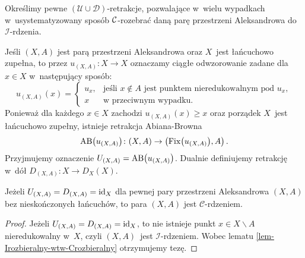 Określimy pewne $(\mathcal{U}\cup \mathcal{D})$-retrakcje, pozwalające w~wielu wypadkach w~usystematyzowany sposób $\mathcal{C}$-rozebrać daną parę przestrzeni Aleksandrowa do $\mathcal{I}$-rdzenia.

Jeśli $(X,A)$ jest parą przestrzeni Aleksandrowa oraz $X$~jest łańcuchowo zupełna, to przez $u_{(X,A)}:X\to X$ oznaczamy ciągłe odwzorowanie zadane dla $x\in X$ w~następujący sposób: \[u_{(X,A)}(x)=\begin{cases}u_x, & \text{jeśli } x\not\in A\text{ jest punktem nieredukowalnym pod } u_x,\\x & \text{w przeciwnym wypadku.}\end{cases}\] Ponieważ dla każdego $x\in X$ zachodzi $u_{(X,A)}(x)\geqslant x$ oraz porządek $X$~jest łańcuchowo zupełny, istnieje retrakcja Abiana-Browna \[\operatorname{AB}\bigl(u_{(X,A)}\bigr)\colon (X,A)\to \left(\operatorname{Fix}\bigl(u_{(X,A)}\bigr),A\right).\] Przyjmujemy oznaczenie $U_{(X,A)}=\operatorname{AB}\bigl(u_{(X,A)}\bigr)$. Dualnie definiujemy retrakcję w~dół $D_{(X,A)}:X\to D_X(X)$. 

\begin{comment}
Niech $\alpha$~będzie liczbą porządkową. \textit{Ciągiem standardowym pary $(X,A)$ o~długości $\alpha$} nazywamy ciąg $(\mathcal{U}\cup\mathcal{D})$-retrakcji $\{r_{\phi,\phi+1}:(X_\phi,A)\to (X_{\phi+1},A)\}_{\phi<\alpha}$ zdefiniowany przez indukcję pozaskończoną w~następujący sposób.
Dla każdej liczby porządkowej $\phi<\alpha$ granicznej lub równej $0$~i~dla każdej skończonej liczby porządkowej $n$~przyjmujemy \[r_{\phi+n,\ \phi+n+1}=\begin{cases}D_{(X_{\phi+n},A)} & \text{dla } n \text{ parzystego,}\\ U_{(X_{\phi+n},A)} & \text{dla } n \text{ nieparzystego,}\end{cases}\] przy czym
\begin{compactitem}
\item[---] $X_0=X$, 
\item[---] $X_{\phi+1}=r_{\phi,\phi+1}(X_\phi)$ dla wszystkich $\phi<\alpha$,
\item[---] $X_\phi=\bigcap_{\psi<\phi}X_\psi$ dla liczb granicznych $\phi\leqslant\alpha$.
\end{compactitem}
\end{comment}

\begin{lem}\label{ciag_standardowy_staly_to_mamy_rdzen}
Jeżeli $U_{(X,A)}=D_{(X,A)}=\operatorname{id}_X$ dla pewnej pary przestrzeni Aleksandrowa $(X,A)$ bez nieskończonych łańcuchów, to para $(X,A)$ jest $\mathcal{C}$-rdzeniem.
\end{lem}
\begin{proof}
Jeżeli $U_{(X,A)}=D_{(X,A)}=\operatorname{id}_X$, to nie istnieje punkt $x\in X\smallsetminus A$ nieredukowalny w~$X$, czyli $(X,A)$~jest $\mathcal{I}$-rdzeniem. Wobec lematu \ref{lem-Irozbieralny-wtw-Crozbieralny} otrzymujemy tezę.
\end{proof}

